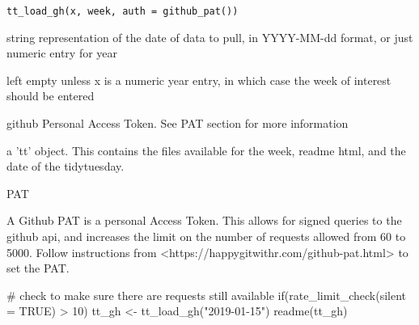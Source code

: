 \documentclass[letterpaper]{book}
\begin{document}
%
\begin{Usage}
\begin{verbatim}
tt_load_gh(x, week, auth = github_pat())
\end{verbatim}
\end{Usage}
%
\begin{Arguments}
\begin{ldescription}
\item[\code{x}] string representation of the date of data to pull, in
YYYY-MM-dd format, or just numeric entry for year

\item[\code{week}] left empty unless x is a numeric year entry, in which case the
week of interest should be entered

\item[\code{auth}] github Personal Access Token. See PAT section for more
information
\end{ldescription}
\end{Arguments}
%
\begin{Value}
a 'tt' object. This contains the files available for the week,
readme html, and the date of the tidytuesday.
\end{Value}
%
\begin{Section}{PAT}


A Github PAT is a personal Access Token. This allows for signed queries to
the github api, and increases the limit on the number of requests allowed
from 60 to 5000. Follow instructions from
<https://happygitwithr.com/github-pat.html> to set the PAT.
\end{Section}
%
\begin{Examples}
\begin{ExampleCode}
# check to make sure there are requests still available
if(rate_limit_check(silent = TRUE) > 10){
 tt_gh <- tt_load_gh("2019-01-15")
 readme(tt_gh)
}

\end{ExampleCode}
\end{Examples}
\printindex{}
\end{document}
